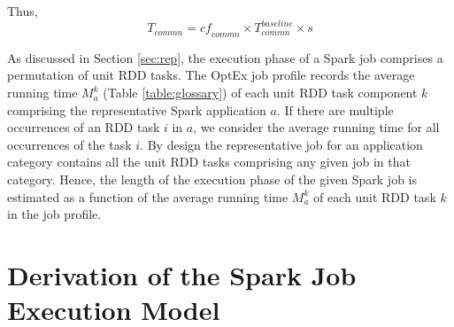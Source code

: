 \documentclass[conference]{IEEEtran}
\begin{document}
Thus, \begin{equation}\label{eqn:commn2}
 \mathit{T_{\mathit{commn}}} = \mathit{\mathit{cf}_{\mathit{commn}}} \times  \mathit{T_{\mathit{commn}}^{\mathit{baseline}}} \times \mathit{s}
 \end{equation}
\par As discussed in Section \ref{sec:rep}, the execution phase of a Spark job comprises a permutation
 of unit RDD tasks. The OptEx job profile records the average running time
$\mathit{M_{a}^{k}}$ (Table \ref{table:glossary}) of each unit RDD task component $k$ comprising the representative Spark application $a$. If there are multiple occurrences of an RDD task $i$ in $a$, we consider the
average running time for all occurrences of the task $i$. By design the representative job for an application category
contains all the unit RDD tasks comprising any given job in that category. Hence, the
length of the execution phase of the given Spark job is estimated as a function of the average running time $\mathit{M_{a}^{k}}$
 of each unit RDD task $k$ in the job profile.







 \section{Derivation of the Spark Job Execution Model}\label{sec:model}
\end{document}
